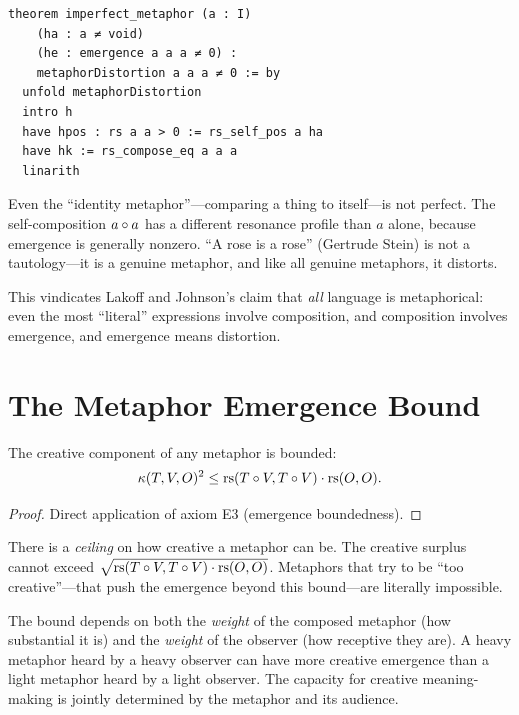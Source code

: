 \begin{lstlisting}
theorem imperfect_metaphor (a : I)
    (ha : a ≠ void)
    (he : emergence a a a ≠ 0) :
    metaphorDistortion a a a ≠ 0 := by
  unfold metaphorDistortion
  intro h
  have hpos : rs a a > 0 := rs_self_pos a ha
  have hk := rs_compose_eq a a a
  linarith
\end{lstlisting}

\begin{remark}
Even the ``identity metaphor''---comparing a thing to itself---is not
perfect.  The self-composition $a \circ a$ has a different resonance
profile than $a$ alone, because emergence is generally nonzero.
``A rose is a rose'' (Gertrude Stein) is not a tautology---it is a
genuine metaphor, and like all genuine metaphors, it distorts.

This vindicates Lakoff and Johnson's claim that \emph{all} language is
metaphorical: even the most ``literal'' expressions involve composition,
and composition involves emergence, and emergence means distortion.
\end{remark}

\section{The Metaphor Emergence Bound}

\begin{theorem}
\label{thm:metaphor-bound}
The creative component of any metaphor is bounded:
\[
  \kappa(T, V, O)^2 \leq \mathrm{rs}(T \circ V, T \circ V) \cdot \mathrm{rs}(O, O).
\]
\end{theorem}

\begin{proof}
Direct application of axiom E3 (emergence boundedness).
\end{proof}

\begin{remark}
There is a \emph{ceiling} on how creative a metaphor can be.  The
creative surplus cannot exceed $\sqrt{\mathrm{rs}(T \circ V, T \circ V)
\cdot \mathrm{rs}(O, O)}$.  Metaphors that try to be ``too creative''---that
push the emergence beyond this bound---are literally impossible.

The bound depends on both the \emph{weight} of the composed metaphor
(how substantial it is) and the \emph{weight} of the observer (how
receptive they are).  A heavy metaphor heard by a heavy observer can
have more creative emergence than a light metaphor heard by a light
observer.  The capacity for creative meaning-making is jointly
determined by the metaphor and its audience.
\end{remark}

